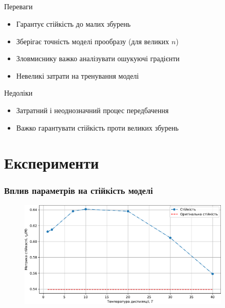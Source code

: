 \documentclass{beamer}
\numberwithin{equation}{section}
\begin{document}
	\subsection{}
	\begin{frame}
		\begin{block}{Переваги}
			\begin{itemize}
				\item Гарантує стійкість до малих збурень
				\item Зберігає точність моделі прообразу (для великих $n$)
				\item Зловмиснику важко аналізувати ошукуючі градієнти
				\item Невеликі затрати на тренування моделі
			\end{itemize}
		\end{block}
		
		\begin{block}{Недоліки}
			\begin{itemize}
				\item Затратний і неоднозначний процес передбачення
				\item Важко гарантувати стійкість проти великих збурень
			\end{itemize}
		\end{block}
	\end{frame}

	
	
	
	\section{Експерименти}
	\begin{frame}
		\frametitle{Вплив параметрів на стійкість моделі}
		
		\begin{figure}[h]
			\centering
			\includegraphics[width=0.9\textwidth]{../images/robustness.pdf}
			
		\end{figure}
	\end{frame}
\end{document}
